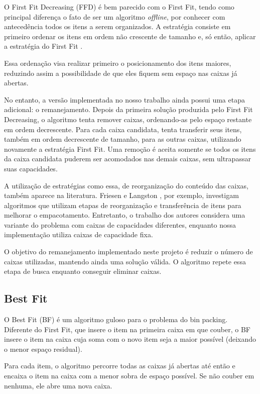 \documentclass[12pt]{article}
\begin{document}
O First Fit Decreasing (FFD) é bem parecido com o First Fit, tendo como principal diferença o fato de ser um algoritmo \textit{offline}, por conhecer com antecedência todos os itens a serem organizados. A estratégia consiste em primeiro ordenar os itens em ordem não crescente de tamanho e, só então, aplicar a estratégia do First Fit \cite{ambrose2025}.

Essa ordenação visa realizar primeiro o posicionamento dos itens maiores, reduzindo assim a possibilidade de que eles fiquem sem espaço nas caixas já abertas.

No entanto, a versão implementada no nosso trabalho ainda possui uma etapa adicional: o remanejamento. Depois da primeira solução produzida pelo First Fit Decreasing, o algoritmo tenta remover caixas, ordenando-as pelo espaço restante em ordem decrescente. Para cada caixa candidata, tenta transferir seus itens, também em ordem decrescente de tamanho, para as outras caixas, utilizando novamente a estratégia First Fit. Uma remoção é aceita somente se todos os itens da caixa candidata puderem ser acomodados nas demais caixas, sem ultrapassar suas capacidades.

A utilização de estratégias como essa, de reorganização do conteúdo das caixas, também aparece na literatura. Friesen e Langston \cite{friesen1986}, por exemplo, investigam algoritmos que utilizam etapas de reorganização e transferência de itens para melhorar o empacotamento. Entretanto, o trabalho dos autores considera uma variante do problema com caixas de capacidades diferentes, enquanto nossa implementação utiliza caixas de capacidade fixa.

O objetivo do remanejamento implementado neste projeto é reduzir o número de caixas utilizadas, mantendo ainda uma solução válida. O algoritmo repete essa etapa de busca enquanto conseguir eliminar caixas.

\subsection{Best Fit}

 O Best Fit (BF) é um algoritmo guloso para o problema do bin packing. Diferente do First Fit, que insere o item na primeira caixa em que couber, o BF insere o item na caixa cuja soma com o novo item seja a maior possível (deixando o menor espaço residual).

Para cada item, o algoritmo percorre todas as caixas já abertas até então e encaixa o item na caixa com a menor sobra de espaço possível. Se não couber em nenhuma, ele abre uma nova caixa.
\end{document}
